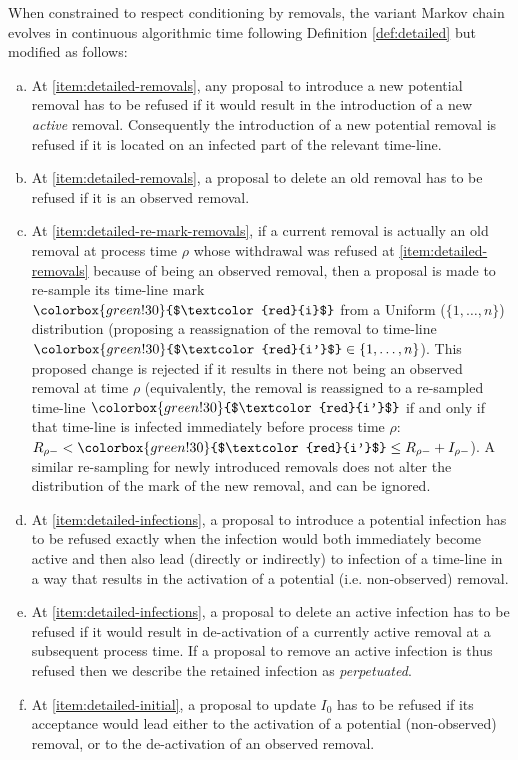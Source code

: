 \documentclass[]{article}
\newcommand{\target}{{\colorbox{green!30}{$\textcolor{red}{i}$}}}
\newcommand{\targetm}{{\colorbox{green!30}{$\textcolor{red}{i'}$}}}
\begin{document}
\begin{defn}
When constrained to respect conditioning by removals, the variant
\label{def:variant-evolution}
Markov chain evolves
in continuous algorithmic time following Definition \ref{def:detailed} but modified as follows:%
\begin{enumerate}[(a)]
 \item \label{item:refuse-new-removal}
At \ref{item:detailed-removals}, 
any proposal to introduce a new potential removal has to be refused 
if it would result in the introduction of a new \emph{active} removal.
Consequently the introduction of a new potential removal is refused 
if it is located on an infected part of the relevant time-line. 
\item \label{item:perpetuate-old-removal} 
At \ref{item:detailed-removals}, 
a proposal to delete an old removal has to be refused if it is an observed removal. 
\item  \label{item:re-sample-old-mark}
At \ref{item:detailed-re-mark-removals}, 
if a current removal is actually 
an old removal at  process time \(\rho\) whose withdrawal was refused at \ref{item:detailed-removals} because 
of being an observed removal,
then a proposal is made to re-sample its time-line mark
\(\target\) from a Uniform (\(\{1,\dots,n\}\)) distribution 
(proposing a reassignation of
the removal to time-line \(\targetm\in\{1,\dots,n\}\)).
This proposed change is rejected
if it results in there
not being an observed removal at time \(\rho\)
(equivalently, the removal is reassigned to 
a re-sampled time-line \(\targetm\) if and only if 
that time-line is infected immediately before process time \(\rho\): \(R_{\rho-} < \targetm \leq R_{\rho-} + I_{\rho-}\)).
A similar re-sampling for newly introduced removals does not alter the distribution of the mark of
the new removal, and can be ignored.
\item  \label{item:refuse-new-infection}
At \ref{item:detailed-infections},
a proposal to introduce a potential infection 
has to be refused exactly when the infection would both immediately become active and then also
lead (directly or indirectly) to infection of a time-line in a way that results
in the activation of 
a potential (i.e. non-observed) removal.
\item  \label{item:perpetuate-old-infection}
At \ref{item:detailed-infections},
a proposal to delete an active infection has to be refused if it would result in 
de-activation of a currently active removal
at a subsequent process time.
If a proposal to remove an active infection is thus refused
then we describe
the retained infection as \emph{perpetuated}. 
\item  \label{item:update-initial}
At \ref{item:detailed-initial}, a proposal to update \(I_0\) has to be refused if its acceptance would lead either to the activation of a potential (non-observed) removal, or to the de-activation of an observed removal.
\end{enumerate}
\end{defn}
\end{document}
